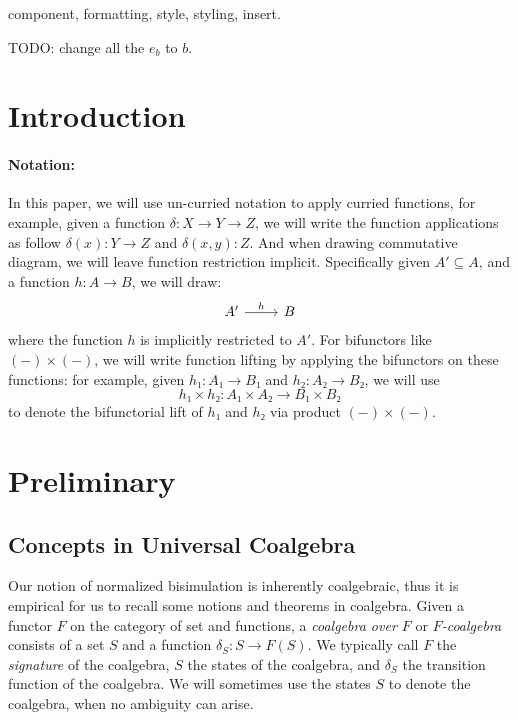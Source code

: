 \documentclass[conference]{IEEEtran}
\begin{document}
\begin{IEEEkeywords}
component, formatting, style, styling, insert.
\end{IEEEkeywords}

TODO: change all the \(e_b\) to \(b\).



\section{Introduction}

\paragraph{Notation: } In this paper, we will use un-curried notation to apply curried functions, for example, given a function \(δ: X → Y → Z\), we will write the function applications as follow \(δ(x): Y → Z\) and \(δ(x, y): Z\). And when drawing commutative diagram, we will leave function restriction implicit. Specifically given \(A' ⊆ A\), and a function \(h: A → B\), we will draw:
\[
    \begin{tikzcd}
        A' \ar{r}{h} & B
    \end{tikzcd}
\]
where the function \(h\) is implicitly restricted to \(A'\).
For bifunctors like \((-) × (-)\), we will write function lifting by applying the bifunctors on these functions: for example, given \(h₁: A₁ → B₁\) and \(h₂: A₂ → B₂\), we will use \[h₁ × h₂: A₁ × A₂ → B₁ × B₂\] to denote the bifunctorial lift of \(h₁\) and \(h₂\) via product \((-) × (-)\).

\section{Preliminary}

\subsection{Concepts in Universal Coalgebra}

Our notion of normalized bisimulation is inherently coalgebraic, thus it is empirical for us to recall some notions and theorems in coalgebra.
Given a functor \(F\) on the category of set and functions, a \emph{coalgebra over \(F\)} or \emph{\(F\)-coalgebra} consists of a set \(S\) and a function \(δ_S: S → F(S)\).
We typically call \(F\) the \emph{signature} of the coalgebra, \(S\) the states of the coalgebra, and \(δ_S\) the transition function of the coalgebra.
We will sometimes use the states \(S\) to denote the coalgebra, when no ambiguity can arise. 
\end{document}
